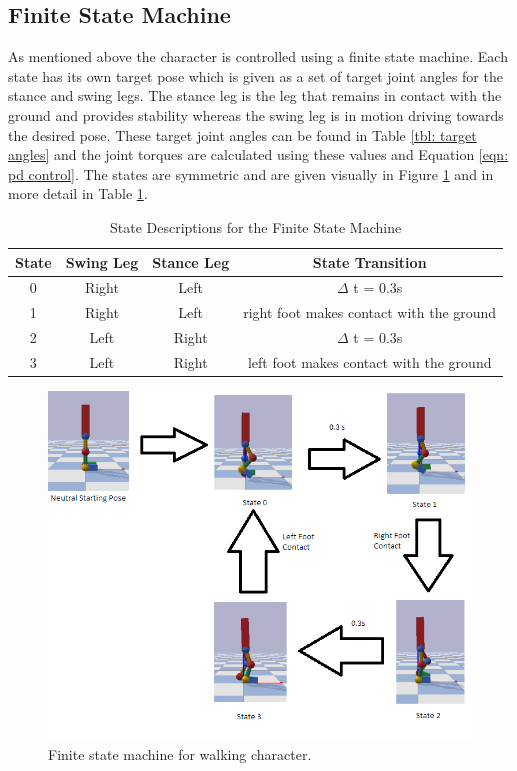 \documentclass[12pt, a4paper]{article}
\begin{document}
\subsection{Finite State Machine}
As mentioned above the character is controlled using a finite state machine. Each state has its own target pose which is given as a set of target joint angles for the stance and swing legs. The stance leg is the leg that remains in contact with the ground and provides stability whereas the swing leg is in motion driving towards the desired pose. These target joint angles can be found in Table \ref{tbl: target angles} and the joint torques are calculated using these values and Equation \ref{eqn: pd control}. The states are symmetric  and are given visually in Figure \ref{fig: finite state} and in more detail in Table \ref{tbl:state descriptions}.

\begin{table}[ht]
\caption{State Descriptions for the Finite State Machine}
\begin{center}
\begin{tabular}{|c|c|c|c|}
\hline
State& Swing Leg & Stance Leg& State Transition\\
\hline 
0& Right & Left&  $\Delta$ t = 0.3s\\
\hline
1 &  Right& Left & right foot makes contact with the ground\\
\hline
2 &  Left & Right & $\Delta$ t = 0.3s\\
\hline
3 & Left& Right& left foot makes contact with the ground\\
\hline
\end{tabular}
\end{center}
\label{tbl:state descriptions}
\end{table}

  
\begin{figure}
\begin{center}
\includegraphics[scale=0.8]{finite_state}
\caption{Finite state machine for walking character.}
\label{fig: finite state}
\end{center}
\end{figure}
\end{document}

